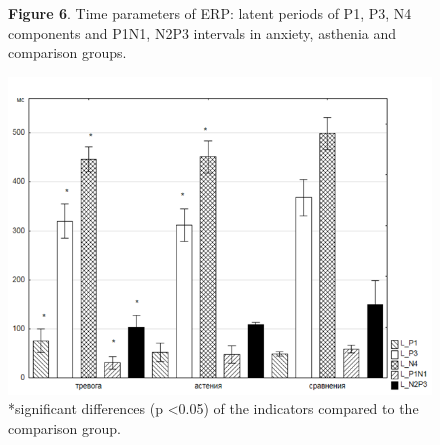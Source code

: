 \documentclass[twocolumn]{article}
\begin{document}
\begin{figure}
\caption{\textbf{Figure 6}. Time parameters of ERP: latent periods of P1, P3, N4 components and P1N1, N2P3 intervals in anxiety, asthenia and comparison groups.}
\label{fig6}
\includegraphics[width=\linewidth ]{fig6.png}
\caption*{*significant differences (p \textless{}0.05) of the indicators compared to the comparison group.}
\end{figure}
\end{document}
